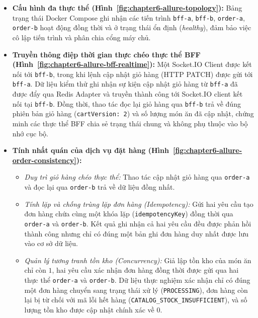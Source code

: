 \begin{itemize}
  \item \textbf{Cấu hình đa thực thể (Hình~\ref{fig:chapter6-allure-topology}):} Bảng trạng thái Docker Compose ghi nhận các tiến trình \texttt{bff-a}, \texttt{bff-b}, \texttt{order-a}, \texttt{order-b} hoạt động đồng thời và ở trạng thái ổn định (\textit{healthy}), đảm bảo việc cô lập tiến trình và phân chia cổng máy chủ.
  \item \textbf{Truyền thông điệp thời gian thực chéo thực thể BFF (Hình~\ref{fig:chapter6-allure-bff-realtime}):} Một Socket.IO Client được kết nối tới \texttt{bff-b}, trong khi lệnh cập nhật giỏ hàng (HTTP PATCH) được gửi tới \texttt{bff-a}. Dữ liệu kiểm thử ghi nhận sự kiện cập nhật giỏ hàng từ \texttt{bff-a} đã được đẩy qua Redis Adapter và truyền thành công tới Socket.IO client kết nối tại \texttt{bff-b}. Đồng thời, thao tác đọc lại giỏ hàng qua \texttt{bff-b} trả về đúng phiên bản giỏ hàng (\texttt{cartVersion: 2}) và số lượng món ăn đã cập nhật, chứng minh các thực thể BFF chia sẻ trạng thái chung và không phụ thuộc vào bộ nhớ cục bộ.
  \item \textbf{Tính nhất quán của dịch vụ đặt hàng (Hình~\ref{fig:chapter6-allure-order-consistency}):} 
    \begin{itemize}
      \item \textit{Duy trì giỏ hàng chéo thực thể:} Thao tác cập nhật giỏ hàng qua \texttt{order-a} và đọc lại qua \texttt{order-b} trả về dữ liệu đồng nhất.
      \item \textit{Tính lặp và chống trùng lặp đơn hàng (Idempotency):} Gửi hai yêu cầu tạo đơn hàng chứa cùng một khóa lặp (\texttt{idempotencyKey}) đồng thời qua \texttt{order-a} và \texttt{order-b}. Kết quả ghi nhận cả hai yêu cầu đều được phản hồi thành công nhưng chỉ có đúng một bản ghi đơn hàng duy nhất được lưu vào cơ sở dữ liệu.
      \item \textit{Quản lý tương tranh tồn kho (Concurrency):} Giả lập tồn kho của món ăn chỉ còn $1$, hai yêu cầu xác nhận đơn hàng đồng thời được gửi qua hai thực thể \texttt{order-a} và \texttt{order-b}. Dữ liệu thực nghiệm xác nhận chỉ có đúng một đơn hàng chuyển sang trạng thái xử lý (\texttt{PROCESSING}), đơn hàng còn lại bị từ chối với mã lỗi hết hàng (\texttt{CATALOG\_STOCK\_INSUFFICIENT}), và số lượng tồn kho được cập nhật chính xác về $0$.
    \end{itemize}
\end{itemize}

